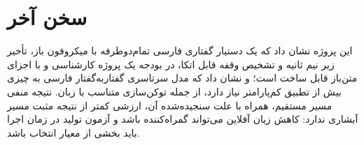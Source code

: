 \section{سخن آخر}
\label{sec:closing}

این پروژه نشان داد که یک دستیار گفتاری فارسی تمام‌دوطرفه با میکروفون باز،
تأخیر زیر نیم ثانیه و تشخیص وقفه قابل اتکا، در بودجه یک پروژه کارشناسی و با
اجزای متن‌باز قابل ساخت است؛ و نشان داد که مدل سرتاسری گفتار‌به‌گفتار فارسی به
چیزی بیش از تطبیق کم‌پارامتر نیاز دارد، از جمله توکن‌سازی متناسب با زبان.
نتیجه منفی مسیر مستقیم، همراه با علت سنجیده‌شده آن، ارزشی کمتر از نتیجه مثبت
مسیر آبشاری ندارد: کاهش زیان آفلاین می‌تواند گمراه‌کننده باشد و آزمون تولید
در زمان اجرا باید بخشی از معیار انتخاب باشد.
